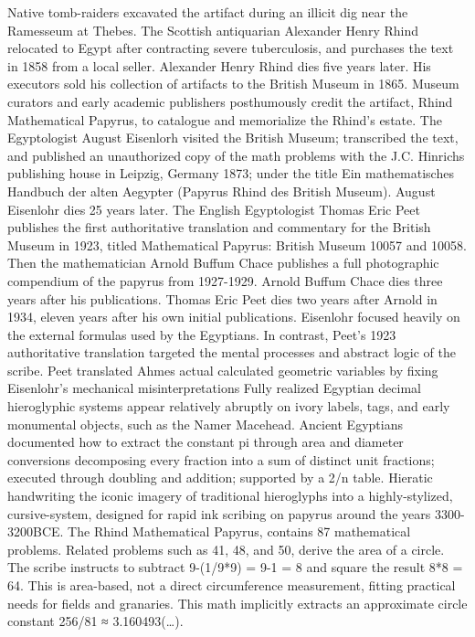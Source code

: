 Native tomb-raiders excavated the artifact during an illicit dig near the Ramesseum at Thebes. The Scottish antiquarian Alexander Henry Rhind relocated to Egypt after contracting severe tuberculosis, and purchases the text in 1858 from a local seller. Alexander Henry Rhind dies five years later. His executors sold his collection of artifacts to the British Museum in 1865. Museum curators and early academic publishers posthumously credit the artifact, Rhind Mathematical Papyrus, to catalogue and memorialize the Rhind’s estate. The Egyptologist August Eisenlorh visited the British Museum; transcribed the text, and published an unauthorized copy of the math problems with the J.C. Hinrichs publishing house in Leipzig, Germany 1873; under the title Ein mathematisches Handbuch der alten Aegypter (Papyrus Rhind des British Museum). August Eisenlohr dies 25 years later. The English Egyptologist Thomas Eric Peet publishes the first authoritative translation and commentary for the British Museum in 1923, titled Mathematical Papyrus: British Museum 10057 and 10058. Then the mathematician Arnold Buffum Chace publishes a full photographic compendium of the papyrus from 1927-1929. Arnold Buffum Chace dies three years after his publications. Thomas Eric Peet dies two years after Arnold in 1934, eleven years after his own initial publications. Eisenlohr focused heavily on the external formulas used by the Egyptians. In contrast, Peet’s 1923 authoritative translation targeted the mental processes and abstract logic of the scribe. Peet translated Ahmes actual calculated geometric variables by fixing Eisenlohr’s mechanical misinterpretations
Fully realized Egyptian decimal hieroglyphic systems appear relatively abruptly on ivory labels, tags, and early monumental objects, such as the Namer Macehead. Ancient Egyptians documented how to extract the constant pi through area and diameter conversions decomposing every fraction into a sum of distinct unit fractions; executed through doubling and addition; supported by a 2/n table. Hieratic handwriting the iconic imagery of traditional hieroglyphs into a highly-stylized, cursive-system, designed for rapid ink scribing on papyrus around the years 3300-3200BCE. The Rhind Mathematical Papyrus, contains 87 mathematical problems. Related problems such as 41, 48, and 50, derive the area of a circle. 
The scribe instructs to subtract 9-(1/9*9) = 9-1 = 8 and square the result 8*8 = 64.
This is area-based, not a direct circumference measurement, fitting practical needs for fields and granaries. This math implicitly extracts an approximate circle constant 256/81 ≈ 3.160493(…).
